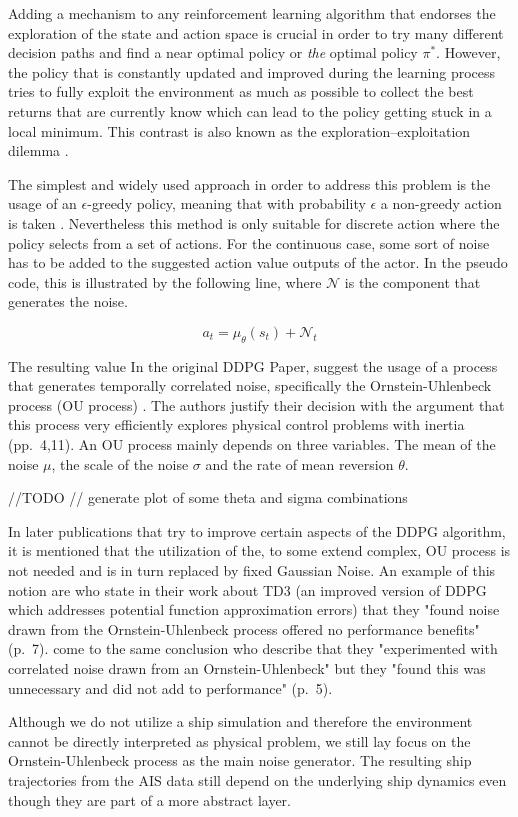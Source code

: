 Adding a mechanism to any reinforcement learning algorithm that endorses the exploration of the state and action space is crucial in order to try many different decision paths and find a near optimal policy or \textit{the} optimal policy $\pi^*$. However, the policy that is constantly updated and improved during the learning process tries to fully exploit the environment as much as possible to collect the best returns that are currently know which can lead to the policy getting stuck in a local minimum. This contrast is also known as the exploration–exploitation dilemma \cite[p.~3]{Sutton1998}.
\par
The simplest and widely used approach in order to address this problem is the usage of an $\epsilon$-greedy policy, meaning that with probability $\epsilon$ a non-greedy action is taken \cite[p.~100]{Sutton1998}. Nevertheless this method is only suitable for discrete action where the policy selects from a set of actions. For the continuous case, some sort of noise has to be added to the suggested action value outputs of the actor. In the pseudo code, this is illustrated by the following line, where $\mathcal{N}$ is the component that generates the noise.
\par
\begin{equation*}
    a_t = \mu_\theta(s_t) + \mathcal{N}_t
\end{equation*}
\par 
The resulting value 
In the original DDPG Paper, \cite{lillicrap2019continuous} suggest the usage of a process that generates temporally correlated noise, specifically the Ornstein-Uhlenbeck process (OU process) \cite[]{uhlenbeck1930theory}. The authors justify their decision with the argument that this process very efficiently explores physical control problems with inertia (pp.~4,11). An OU process mainly depends on three variables. The mean of the noise $\mu$, the scale of the noise $\sigma$ and the rate of mean reversion $\theta$.
\par
//TODO
// generate plot of some theta and sigma combinations
\par
In later publications that try to improve certain aspects of the DDPG algorithm, it is mentioned that the utilization of the, to some extend complex, OU process is not needed and is in turn replaced by fixed Gaussian Noise. An example of this notion are \cite{fujimoto2018addressing} who state in their work about TD3 (an improved version of DDPG which addresses potential function approximation errors) that they "found noise drawn from the Ornstein-Uhlenbeck process offered no performance benefits" (p.~7). \cite{barth2018distributed} come to the same conclusion who describe that they "experimented with correlated noise drawn from an Ornstein-Uhlenbeck" but they "found this was unnecessary and did
not add to performance" (p.~5).
\par
Although we do not utilize a ship simulation and therefore the environment cannot be directly interpreted as physical problem, we still lay focus on the Ornstein-Uhlenbeck process as the main noise generator. The resulting ship trajectories from the AIS data still depend on the underlying ship dynamics even though they are part of a more abstract layer.